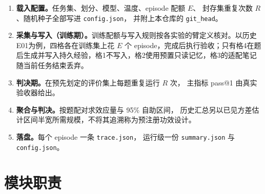 \begin{enumerate}
  \item \textbf{载入配置。}任务集、划分、模型、温度、episode 配额 $E$、
        封存集重复次数 $R$、随机种子全部写进 \texttt{config.json}，
        并附上本仓库的 \texttt{git\_head}。
  \item \textbf{采集与写入（训练期）。}训练配额与写入规则按各实验的臂定义核对。以历史E01为例，四格各在训练集上花 $E$ 个 episode，完成后执行验收；只有格4在题后生成并写入持久经验，格1不写入，格2使用预置只读记忆，格3的适配笔记随当前任务结束丢弃。
  \item \textbf{判决期。}在预先划定的评价集上每题重复运行 $R$ 次，
        主指标 pass@1 由真实验收器给出。
  \item \textbf{聚合与判决。}按题配对求效应量与 95\% 自助区间，
        历史汇总另以已见方差估计区间半宽所需规模，不将其追溯称为预注册功效设计。
  \item \textbf{落盘。}每个 episode 一条 \texttt{trace.json}，
        运行级一份 \texttt{summary.json} 与 \texttt{config.json}。
\end{enumerate}

\section{模块职责}
\label{sec:appb-modules}

